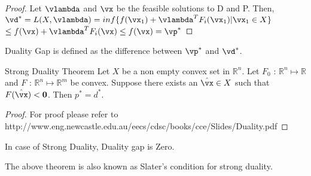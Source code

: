 \documentclass[a4paper,11pt]{article}
\begin{document}
\begin{proof}
 Let $\vlambda$ and $\vx$ be the feasible solutions to D and P. Then, \newline
 \( \vd^*=L(X,\vlambda)=inf\{f(\vx_1) + \vlambda^TF_i(\vx_1) | \vx_1 \in X \} \)
 \(   \leq f(\vx) + \vlambda^TF_i(\vx) \leq f(\vx) = \vp^*\)
\end{proof}

\begin{definition}
Duality Gap is defined as the difference between $\vp^*$ and $\vd^*$.
\end{definition}

\begin{theorem}
Strong Duality Theorem \newline \newline
Let $X$ be a non empty convex set in \( \mathbb{R}^n\). Let $F_0$ : $\mathbb{R}^n \mapsto \mathbb{R}$ and $F$ : $\mathbb{R}^n \mapsto \mathbb{R}^m$ be convex. Suppose there exists an $\hat{\vx} \in X$ such that $F(\hat{\vx})<\vzero$. Then \newline
\( p^* = d^* \).
\end{theorem}

\begin{proof}
For proof please refer to http://www.eng.newcastle.edu.au/eecs/cdsc/books/cce/Slides/Duality.pdf
\end{proof}

\begin{corollary}
In case of Strong Duality, Duality gap is Zero.
\end{corollary}
\begin{remark}
The above theorem is also known as Slater's condition for strong duality.
\end{remark}
\end{document}
